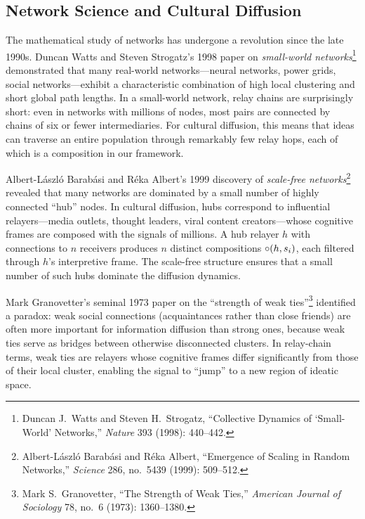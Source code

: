 \subsection{Network Science and Cultural Diffusion}

The mathematical study of networks has undergone a revolution since the
late 1990s.  Duncan Watts and Steven Strogatz's 1998 paper on
\emph{small-world networks}\footnote{Duncan J.\ Watts and Steven H.\
Strogatz, ``Collective Dynamics of `Small-World' Networks,'' \textit{Nature}
393 (1998): 440--442.} demonstrated that many real-world networks---neural
networks, power grids, social networks---exhibit a characteristic
combination of high local clustering and short global path lengths.  In a
small-world network, relay chains are surprisingly short: even in networks
with millions of nodes, most pairs are connected by chains of six or fewer
intermediaries.  For cultural diffusion, this means that ideas can traverse
an entire population through remarkably few relay hops, each of which is a
composition in our framework.

Albert-L\'aszl\'o Barab\'asi and R\'eka Albert's 1999 discovery of
\emph{scale-free networks}\footnote{Albert-L\'aszl\'o Barab\'asi and R\'eka
Albert, ``Emergence of Scaling in Random Networks,'' \textit{Science} 286,
no.\ 5439 (1999): 509--512.} revealed that many networks are dominated by a
small number of highly connected ``hub'' nodes.  In cultural diffusion,
hubs correspond to influential relayers---media outlets, thought leaders,
viral content creators---whose cognitive frames are composed with the
signals of millions.  A hub relayer $h$ with connections to $n$ receivers
produces $n$ distinct compositions $\circ(h, s_i)$, each filtered through
$h$'s interpretive frame.  The scale-free structure ensures that a small
number of such hubs dominate the diffusion dynamics.

Mark Granovetter's seminal 1973 paper on the ``strength of weak
ties''\footnote{Mark S.\ Granovetter, ``The Strength of Weak Ties,''
\textit{American Journal of Sociology} 78, no.\ 6 (1973): 1360--1380.}
identified a paradox: weak social connections (acquaintances rather than
close friends) are often more important for information diffusion than
strong ones, because weak ties serve as bridges between otherwise
disconnected clusters.  In relay-chain terms, weak ties are relayers whose
cognitive frames differ significantly from those of their local cluster,
enabling the signal to ``jump'' to a new region of ideatic space.

